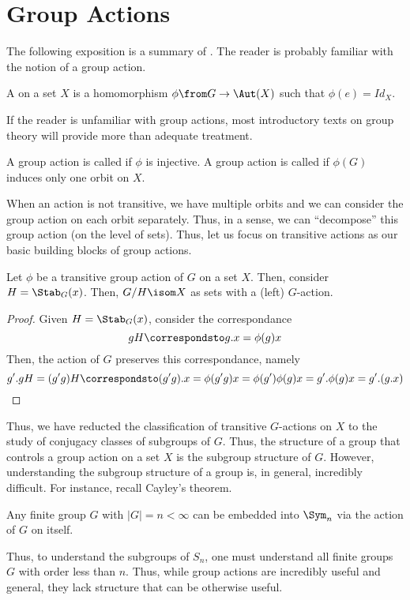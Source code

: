 \documentclass[11pt,leqno,oneside]{amsbook}
\numberwithin{thm}{section}
\begin{document}
\section{Group Actions}
The following exposition is a summary of \cite{princeton-companion}. The reader is probably familiar with the notion of a group action.
\begin{defn}
  A  on a set \(X\) is a homomorphism \(\phi \from G \to \Aut(X)\)
  such that \(\phi(e) = Id_X\).
\end{defn}
If the reader is unfamiliar with group actions, most introductory
texts on group theory will provide more than adequate treatment.
\begin{defn}
  A group action is called  if \(\phi\) is injective. A
  group action is called  if \(\phi(G)\) induces only
  one orbit on \(X\).
\end{defn}
When an action is not transitive, we have multiple orbits and we can
consider the group action on each orbit separately. Thus, in a sense,
we can ``decompose'' this group action (on the level of sets). Thus,
let us focus on transitive actions as our basic building blocks of
group actions.
\begin{thm}
  Let \(\phi\) be a transitive group action of \(G\) on a set \(X\). Then,
  consider \(H = \Stab_G(x)\). Then, \(G/H \isom X\) as sets with a
  (left) \(G\)-action.
\end{thm}
\begin{proof}
  Given \(H = \Stab_G(x)\), consider the correspondance \[
    gH \correspondsto g.x = \phi(g)x
  \]
  Then, the action of \(G\) preserves this correspondance, namely \[
    g'.gH = (g'g)H \correspondsto (g'g).x = \phi(g'g)x = \phi(g')\phi(g)x
    = g'.\phi(g)x = g'.(g.x)
  \]
\end{proof}
Thus, we have reducted the classification of transitive \(G\)-actions
on \(X\) to the study of conjugacy classes of subgroups of
\(G\). Thus, the structure of a group that controls a group action on
a set \(X\) is the subgroup structure of \(G\). However, understanding
the subgroup structure of a group is, in general, incredibly
difficult. For instance, recall Cayley's theorem.
\begin{thm}
  Any finite group \(G\) with \(|G| = n < \infty\) can be embedded
  into \(\Sym_n\) via the action of \(G\) on itself. 
\end{thm}
Thus, to understand the subgroups of \(S_n\), one must understand all
finite groups \(G\) with order less than \(n\). Thus, while group
actions are incredibly useful and general, they lack structure that
can be otherwise useful.
\end{document}
